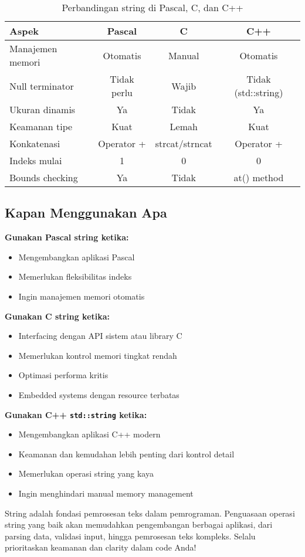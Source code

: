 \documentclass[../main.tex]{subfiles}
\begin{document}
\begin{table}[H]
\centering
\begin{tabular}{|l|c|c|c|}
\hline
\textbf{Aspek} & \textbf{Pascal} & \textbf{C} & \textbf{C++} \\
\hline
Manajemen memori & Otomatis & Manual & Otomatis \\
\hline
Null terminator & Tidak perlu & Wajib & Tidak (std::string) \\
\hline
Ukuran dinamis & Ya & Tidak & Ya \\
\hline
Keamanan tipe & Kuat & Lemah & Kuat \\
\hline
Konkatenasi & Operator + & strcat/strncat & Operator + \\
\hline
Indeks mulai & 1 & 0 & 0 \\
\hline
Bounds checking & Ya & Tidak & at() method \\
\hline
\end{tabular}
\caption{Perbandingan string di Pascal, C, dan C++}
\end{table}

\subsection{Kapan Menggunakan Apa}

\textbf{Gunakan Pascal string ketika:}
\begin{itemize}
  \item Mengembangkan aplikasi Pascal
  \item Memerlukan fleksibilitas indeks
  \item Ingin manajemen memori otomatis
\end{itemize}

\textbf{Gunakan C string ketika:}
\begin{itemize}
  \item Interfacing dengan API sistem atau library C
  \item Memerlukan kontrol memori tingkat rendah
  \item Optimasi performa kritis
  \item Embedded systems dengan resource terbatas
\end{itemize}

\textbf{Gunakan C++ \texttt{std::string} ketika:}
\begin{itemize}
  \item Mengembangkan aplikasi C++ modern
  \item Keamanan dan kemudahan lebih penting dari kontrol detail
  \item Memerlukan operasi string yang kaya
  \item Ingin menghindari manual memory management
\end{itemize}

String adalah fondasi pemrosesan teks dalam pemrograman. Penguasaan operasi string yang baik akan memudahkan pengembangan berbagai aplikasi, dari parsing data, validasi input, hingga pemrosesan teks kompleks. Selalu prioritaskan keamanan dan clarity dalam code Anda!
\end{document}

